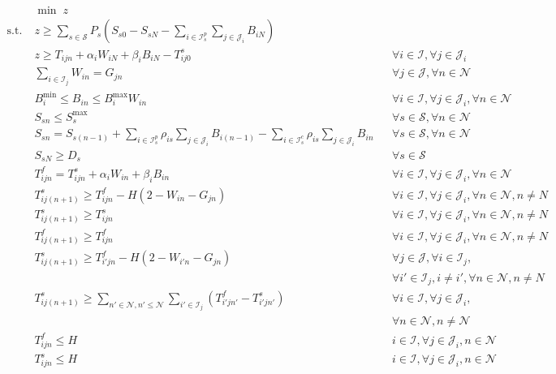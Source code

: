 \begin{align}
&\min \; z &&\\
\text{s.t.}\; &z \ge \sum_{s\in \mathcal{S}} P_s (S_{s0} - S_{sN}  -\sum_{i \in \mathcal{I}_{s}^p}\sum_{j \in \mathcal{J}_{i}} B_{iN}) && \\
		     & z \ge T_{ijn} + \alpha_i W_{iN} + \beta_{i} B_{iN} - T_{ij0}^s  && \forall i \in \mathcal{I}, \forall j \in \mathcal{J}_i \\
		     & \sum_{i \in \mathcal{I}_j} W_{in} = G_{jn} && \forall j \in \mathcal{J}, \forall n \in \mathcal{N} \\
		     &B_{i}^{\text{min}} \le B_{in} \le B_{i}^{\text{max}} W_{in} && \forall i \in \mathcal{I}, \forall j \in \mathcal{J}_i, \forall n \in \mathcal{N} \\
		     & S_{sn} \le S_{s}^{\text{max}} && \forall s \in \mathcal{S}, \forall n \in \mathcal{N} \\
		     & S_{sn} = S_{s(n-1)} + \sum_{i \in \mathcal{I}_{s}^p} \rho_{is} \sum_{j \in \mathcal{J}_{i}} B_{i(n-1)} - \sum_{i \in \mathcal{I}_{s}^c} \rho_{is} \sum_{j \in \mathcal{J}_{i}} B_{in}  &&\forall s \in \mathcal{S}, \forall n \in \mathcal{N} \\
		     & S_{sN} \ge D_s && \forall s \in \mathcal{S} \\
		     & T_{ijn}^f = T_{ijn}^s + \alpha_i W_{in} + \beta_i B_{in} && \forall i \in \mathcal{I}, \forall j \in \mathcal{J}_i, \forall n \in \mathcal{N} \\
		     & T_{ij(n+1)}^s \ge T_{ijn}^f - H (2 - W_{in} - G_{jn}) && \forall i \in \mathcal{I}, \forall j \in \mathcal{J}_i, \forall n \in \mathcal{N}, n \ne N \\
		     & T_{ij(n+1)}^s \ge T_{ijn}^s && \forall i \in \mathcal{I}, \forall j \in \mathcal{J}_i, \forall n \in \mathcal{N}, n \ne N \\
		     & T_{ij(n+1)}^f \ge T_{ijn}^f && \forall i \in \mathcal{I}, \forall j \in \mathcal{J}_i, \forall n \in \mathcal{N}, n \ne N \\
		     & T_{ij(n+1)}^s \ge T_{i'jn}^f - H (2 - W_{i'n} - G_{jn}) && \forall j \in \mathcal{J}, \forall i \in \mathcal{I}_j, \\
		     & &&\forall i' \in \mathcal{I}_j, i \ne i', \forall n \in \mathcal{N}, n \ne N \nonumber \\
		     & T_{ij(n+1)}^s \ge \sum_{n' \in \mathcal{N}, n' \le \mathcal{N}} \sum_{i' \in \mathcal{I}_j} (T_{i'jn'}^f - T_{i'jn'}^s) &&\forall i \in \mathcal{I}, \forall j \in \mathcal{J}_i, \\ 
		     & &&\forall n \in \mathcal{N}, n \ne \mathcal{N} \nonumber \\
		     & T_{ijn}^f \le H && i \in \mathcal{I}, \forall j \in \mathcal{J}_i, n \in \mathcal{N} \\
		     & T_{ijn}^s \le H &&  i \in \mathcal{I}, \forall j \in \mathcal{J}_i, n \in \mathcal{N}
\end{align}

